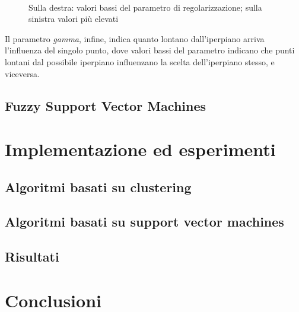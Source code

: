 \documentclass{article}
\begin{document}
	\begin{figure}[h]
		\centering
		 \quad
		 \\
		\caption{Sulla destra: valori bassi del parametro di regolarizzazione; sulla sinistra valori più elevati}
		\label{fig:svm}
	\end{figure}
	Il parametro \textit{gamma}, infine, indica quanto lontano dall'iperpiano arriva l'influenza del singolo punto, dove valori bassi del parametro indicano che punti lontani dal possibile iperpiano influenzano la scelta dell'iperpiano stesso, e viceversa.	
	
	\subsection{Fuzzy Support Vector Machines}
	
	\section{Implementazione ed esperimenti}
	\subsection{Algoritmi basati su clustering}
	\subsection{Algoritmi basati su support vector machines}
	\subsection{Risultati}
	\section{Conclusioni}
	\newpage
\end{document}
